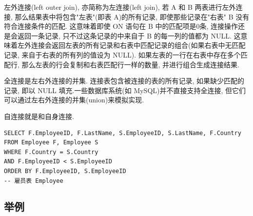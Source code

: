 左外连接(left outer join), 亦简称为左连接(left join), 若 A 和 B 两表进行左外连接, 那么结果表中将包含"左表"(即表 A)的所有记录, 即使那些记录在"右表" B 没有符合连接条件的匹配. 这意味着即使 ON 语句在 B 中的匹配项是0条, 连接操作还是会返回一条记录, 只不过这条记录的中来自于 B 的每一列的值都为 NULL. 这意味着左外连接会返回左表的所有记录和右表中匹配记录的组合(如果右表中无匹配记录, 来自于右表的所有列的值设为 NULL). 如果左表的一行在右表中存在多个匹配行, 那么左表的行会复制和右表匹配行一样的数量, 并进行组合生成连接结果.

全连接是左右外连接的并集. 连接表包含被连接的表的所有记录, 如果缺少匹配的记录, 即以 NULL 填充.一些数据库系统(如 MySQL)并不直接支持全连接, 但它们可以通过左右外连接的并集(union)来模拟实现.

自连接就是和自身连接.

\begin{verbatim}
SELECT F.EmployeeID, F.LastName, S.EmployeeID, S.LastName, F.Country
FROM Employee F, Employee S
WHERE F.Country = S.Country
AND F.EmployeeID < S.EmployeeID
ORDER BY F.EmployeeID, S.EmployeeID
-- 雇员表 Employee
\end{verbatim}

\subsection{举例}

